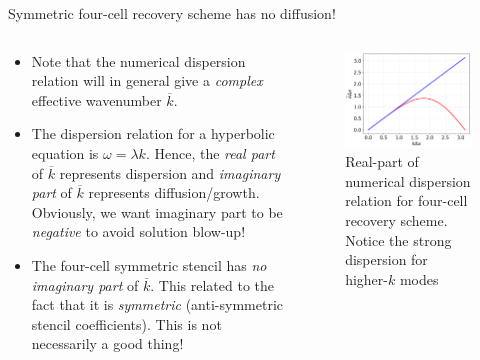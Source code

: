 \documentclass[aspectratio=169]{beamer}
\begin{document}
\begin{frame}{Symmetric four-cell recovery scheme has no diffusion!}
  \small
  \begin{columns}
    
    \begin{column}{0.6\linewidth}
      \begin{itemize}
      \item Note that the numerical dispersion relation will in
        general give a \emph{complex} effective wavenumber
        $\overline{k}$.
      \item The dispersion relation for a hyperbolic equation is
        $\omega = \lambda k$. Hence, the \emph{real part} of
        $\overline{k}$ represents dispersion and \emph{imaginary part}
        of $\overline{k}$ represents diffusion/growth. Obviously, we
        want imaginary part to be \emph{negative} to avoid solution
        blow-up!
      \item The four-cell symmetric stencil has \emph{no imaginary
          part} of $\overline{k}$. This related to the fact that it is
        \emph{symmetric} (anti-symmetric stencil coefficients). This
        is not necessarily a good thing!
      \end{itemize}
    \end{column}
  
    \begin{column}{0.4\linewidth}
      \begin{figure}
        \includegraphics[width=\linewidth]{5p-kbar.png}
        \caption{Real-part of numerical dispersion relation for
          four-cell recovery scheme. Notice the strong dispersion for
          higher-$k$ modes}
      \end{figure}
    \end{column}
  \end{columns}

\end{frame}
\end{document}
